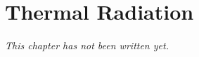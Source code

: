 \chapter{Thermal Radiation}\label{ch:b2:thermal-radiation}


\emph{This chapter has not been written yet.}
